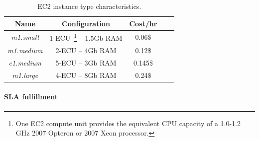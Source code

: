 \begin{table}
  {\scriptsize 
\begin{center}
    \begin{tabular}{  | c | c | c | c | c |}
    \hline
      \textbf{Name}  & \textbf{Configuration} & \textbf{Cost/hr} \\ \hline
   \textit{m1.small}   & 1-ECU~\footnote{One EC2 compute unit provides the equivalent CPU capacity of a 1.0-1.2 GHz 2007 Opteron or 2007 Xeon processor.}  -- 1.5Gb RAM&  0.06\$ \\ \hline
   \textit{m1.medium}   & 2-ECU -- 4Gb RAM&  0.12\$ \\ \hline
\textit{c1.medium} & 5-ECU -- 3Gb RAM& 0.145\$   \\ \hline
\textit{m1.large} & 4-ECU -- 8Gb RAM& 0.24\$   \\ \hline
 \end{tabular}
\end{center}
\vspace{-5mm}
\caption{EC2 instance type characteristics.}
\label{EC2instances}
}
\end{table}

\paragraph{SLA fulfillment}

